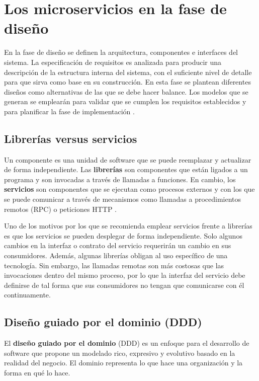 \documentclass[11pt,spanish,listoffigures]{tfgetsinf}
\begin{document}
\section{Los microservicios en la fase de diseño} \label{sct:FaseDiseño}

En la fase de diseño se definen la arquitectura, componentes e interfaces del sistema. La especificación de requisitos es analizada para producir una descripción de la estructura interna del sistema, con el suficiente nivel de detalle para que sirva como base en su construcción. En esta fase se plantean diferentes diseños como alternativas de las que se debe hacer balance. Los modelos que se generan se emplearán para validar que se cumplen los requisitos establecidos y para planificar la fase de implementación \cite{Bourque2014}.

\subsection{Librerías versus servicios} \label{subsect:librerias}

Un componente es una unidad de software que se puede reemplazar y actualizar de forma independiente. Las \textbf{librerías} son componentes que están ligados a un programa y son invocadas a través de llamadas a funciones. En cambio, los \textbf{servicios} son componentes que se ejecutan como procesos externos y con los que se puede comunicar a través de mecanismos como llamadas a procedimientos remotos (RPC) o peticiones HTTP \cite{Lewis2014}.

Uno de los motivos por los que se recomienda emplear servicios frente a librerías es que los servicios se pueden desplegar de forma independiente. Solo algunos cambios en la interfaz o contrato del servicio requerirán un cambio en sus consumidores. Además, algunas librerías obligan al uso específico de una tecnología. Sin embargo, las llamadas remotas son más costosas que las invocaciones dentro del mismo proceso, por lo que la interfaz del servicio debe definirse de tal forma que sus consumidores no tengan que comunicarse con él continuamente.

\subsection{Diseño guiado por el dominio (DDD)}

El \textbf{diseño guiado por el dominio} (DDD) es un enfoque para el desarrollo de software que propone un modelado rico, expresivo y evolutivo basado en la realidad del negocio. El dominio representa lo que hace una organización y la forma en qué lo hace.
\end{document}
